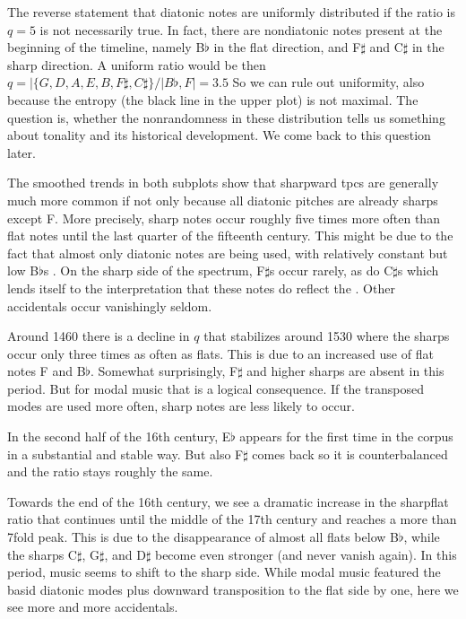 \documentclass[letterpaper,10pt,english]{sphinxmanual}
\begin{document}
\sphinxAtStartPar
The reverse statement that diatonic notes are uniformly distributed if
the ratio is \(q=5\) is not necessarily true. In fact, there are
non\sphinxhyphen{}diatonic notes present at the beginning of the timeline, namely
B\(\flat\) in the flat direction, and F\(\sharp\) and
C\(\sharp\) in the sharp direction. A uniform ratio would be then
\(q=|\{G, D, A, E, B, F\sharp, C\sharp\}/|B\flat, F|=3.5\) So we can
rule out uniformity, also because the entropy (the black line in the
upper plot) is not maximal. The question is, whether the non\sphinxhyphen{}randomness
in these distribution tells us something about tonality and its
historical development. We come back to this question later.

\sphinxAtStartPar
The smoothed trends in both subplots show that sharpward tpcs are
generally much more common if not only because all diatonic pitches are
already sharps except F. More precisely, sharp notes occur roughly five
times more often than flat notes until the last quarter of the fifteenth
century. This might be due to the fact that almost only diatonic notes
are being used, with relatively constant but low B\(\flat\)s
. On the sharp side of the spectrum,
F\(\sharp\)s occur rarely, as do C\(\sharp\)s which
lends itself to the interpretation that these notes do reflect the
. Other accidentals occur vanishingly seldom.

\sphinxAtStartPar
Around 1460 there is a decline in \(q\) that stabilizes around 1530
where the sharps occur only three times as often as flats. This is due
to an increased use of flat notes F and B\(\flat\). Somewhat
surprisingly, F\(\sharp\) and higher sharps are absent in this
period. But for modal music that is a logical consequence. If the
transposed modes are used more often, sharp notes are less likely to
occur.

\sphinxAtStartPar
In the second half of the 16th century, E\(\flat\) appears for the
first time in the corpus in a substantial and stable way. But also
F\(\sharp\) comes back so it is counterbalanced and the ratio
stays roughly the same.

\sphinxAtStartPar
Towards the end of the 16th century, we see a dramatic increase in the
sharp\sphinxhyphen{}flat ratio that continues until the middle of the 17th century and
reaches a more than 7\sphinxhyphen{}fold peak. This is due to the disappearance of
almost all flats below B\(\flat\), while the sharps
C\(\sharp\), G\(\sharp\), and D\(\sharp\) become even
stronger (and never vanish again). In this period, music seems to shift
to the sharp side. While modal music featured the basid diatonic modes
plus downward transposition to the flat side by one, here we see more
and more accidentals.
\end{document}
